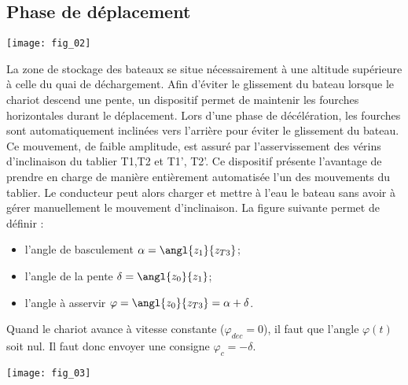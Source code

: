 \subsection*{Phase de déplacement}

\ifprof
\else

\begin{marginfigure}
\texttt{[image: fig\_02]}
\end{marginfigure}

La zone de stockage des bateaux se situe nécessairement à une altitude supérieure à celle du quai de déchargement. Afin d’éviter le glissement du bateau lorsque le chariot descend une pente, un dispositif permet de maintenir les fourches horizontales durant le déplacement. Lors d’une phase de décélération, les fourches sont automatiquement inclinées vers l’arrière pour éviter le glissement du bateau. Ce mouvement, de faible amplitude, est assuré par l’asservissement des vérins d’inclinaison du tablier T1,T2 et T1’, T2’. Ce dispositif présente l’avantage de prendre en charge de manière entièrement automatisée l’un des mouvements du tablier. Le conducteur peut alors charger et mettre à l’eau le bateau sans avoir à gérer manuellement le mouvement d’inclinaison.
La figure suivante permet de définir :
\begin{itemize}
\item l'angle de basculement $\alpha=\angl{z_1}{z_{T3}}$;
\item l'angle de la pente $\delta=\angl{z_0}{z_1}$;
\item l'angle à asservir  $\varphi=\angl{z_0}{z_{T3}}=\alpha+\delta$.
\end{itemize}


\fi


\ifcolle
\else
{}
\ifprof
\begin{corrige}
 Quand le chariot avance à vitesse constante ($\varphi_{dec}=0$), il faut que l'angle $\varphi(t)$ soit nul. Il faut donc envoyer une consigne  $\varphi_c = -\delta$.
\end{corrige}
\else
\fi

\fi


\ifprof
\else


\begin{marginfigure}
\texttt{[image: fig\_03]}
\end{marginfigure}

